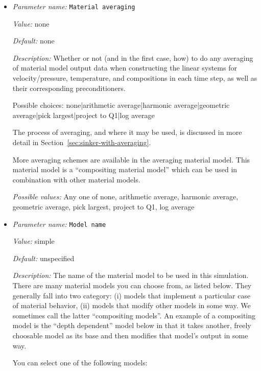 \begin{itemize}
\item {\it Parameter name:} {\tt Material averaging}
\label{parameters:Material model/Material averaging}


{\it Value:} none


{\it Default:} none


{\it Description:} Whether or not (and in the first case, how) to do any averaging of material model output data when constructing the linear systems for velocity/pressure, temperature, and compositions in each time step, as well as their corresponding preconditioners.

Possible choices: none|arithmetic average|harmonic average|geometric average|pick largest|project to Q1|log average

The process of averaging, and where it may be used, is discussed in more detail in Section~\ref{sec:sinker-with-averaging}.

More averaging schemes are available in the averaging material model. This material model is a ``compositing material model'' which can be used in combination with other material models.


{\it Possible values:} Any one of none, arithmetic average, harmonic average, geometric average, pick largest, project to Q1, log average
\item {\it Parameter name:} {\tt Model name}
\label{parameters:Material model/Model name}


{\it Value:} simple


{\it Default:} unspecified


{\it Description:} The name of the material model to be used in this simulation. There are many material models you can choose from, as listed below. They generally fall into two category: (i) models that implement a particular case of material behavior, (ii) models that modify other models in some way. We sometimes call the latter ``compositing models''. An example of a compositing model is the ``depth dependent'' model below in that it takes another, freely choosable model as its base and then modifies that model's output in some way.

You can select one of the following models:


\end{itemize}
